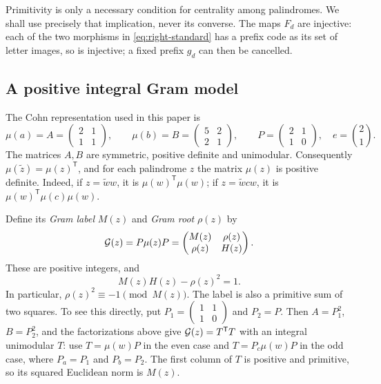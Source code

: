 Primitivity is only a necessary condition for centrality among
palindromes. We shall use precisely that implication, never its
converse. The maps $F_d$ are injective: each of the two morphisms in
\eqref{eq:right-standard} has a prefix code as its set of letter
images, so is injective; a fixed prefix $g_d$ can then be cancelled.

\subsection{A positive integral Gram model}

The Cohn representation used in this paper is
\begin{equation}\label{eq:cohn-generators}
 \mu(a)=A=\begin{pmatrix}2&1\\1&1\end{pmatrix},\qquad
 \mu(b)=B=\begin{pmatrix}5&2\\2&1\end{pmatrix},\qquad
 P=\begin{pmatrix}2&1\\1&0\end{pmatrix},\quad e=\binom21.
\end{equation}
The matrices $A,B$ are symmetric, positive definite and unimodular.
Consequently $\mu(\widetilde z)=\mu(z)^{\mathsf T}$, and for each
palindrome $z$ the matrix $\mu(z)$ is positive definite.
Indeed, if $z=\widetilde w w$, it is $\mu(w)^{\mathsf T}\mu(w)$;
if $z=\widetilde w c w$, it is
$\mu(w)^{\mathsf T}\mu(c)\mu(w)$.

Define its \emph{Gram label} $M(z)$ and \emph{Gram root} $\rho(z)$ by
\begin{equation}\label{eq:palindromic-gram}
 \mathcal{G}(z)=P\mu(z)P
 =\begin{pmatrix}M(z)&\rho(z)\\\rho(z)&H(z)\end{pmatrix}.
\end{equation}
These are positive integers, and
\begin{equation}\label{eq:gram-determinant}
 M(z)H(z)-\rho(z)^2=1.
\end{equation}
In particular, $\rho(z)^2\equiv-1\pmod{M(z)}$.
The label is also a primitive sum of two squares. To see this directly,
put $P_1=\left(\begin{smallmatrix}1&1\\1&0\end{smallmatrix}\right)$
and $P_2=P$. Then $A=P_1^2$, $B=P_2^2$, and the factorizations above
give $\mathcal{G}(z)=T^{\mathsf T}T$ with an integral unimodular $T$:
use $T=\mu(w)P$ in the even case and $T=P_c\mu(w)P$ in the odd
case, where $P_a=P_1$ and $P_b=P_2$. The first column of $T$ is
positive and primitive, so its squared Euclidean norm is $M(z)$.

